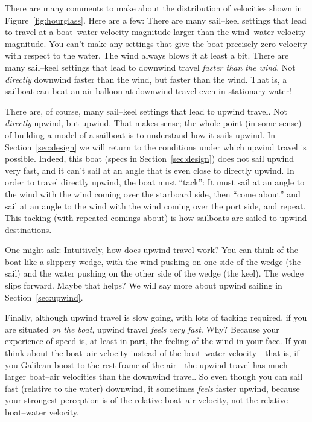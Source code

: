\documentclass[letterpaper]{article}
\newcommand{\secref}[1]{Section~\ref{#1}}
\newcommand{\figref}[1]{Figure~\ref{#1}}
\begin{document}
There are many comments to make about the distribution of velocities shown in \figref{fig:hourglass}.
Here are a few:
There are many sail--keel settings that lead to travel at a boat--water velocity magnitude larger than the wind--water velocity magnitude.
You can't make any settings that give the boat precisely zero velocity with respect to the water.
The wind always blows it at least a bit.
There are many sail--keel settings that lead to downwind travel \emph{faster than the wind}.
Not \emph{directly} downwind faster than the wind, but faster than the wind.
That is, a sailboat can beat an air balloon at downwind travel even in stationary water!

There are, of course, many sail--keel settings that lead to upwind travel.
Not \emph{directly} upwind, but upwind.
That makes sense; the whole point (in some sense) of building a model of a sailboat is to understand how it sails upwind.
In \secref{sec:design} we will return to the conditions under which upwind travel is possible.
Indeed, this boat (specs in \secref{sec:design}) does not sail upwind very fast, and it can't sail at an angle that is even close to directly upwind.
In order to travel directly upwind, the boat must ``tack'': It must sail at an angle to the wind with the wind coming over the starboard side, then ``come about'' and sail at an angle to the wind with the wind coming over the port side, and repeat.
This tacking (with repeated comings about) is how sailboats are sailed to upwind destinations.

One might ask: Intuitively, how does upwind travel work?
You can think of the boat like a slippery wedge, with the wind pushing on one side of the wedge (the sail) and the water pushing on the other side of the wedge (the keel).
The wedge slips forward.
Maybe that helps?
We will say more about upwind sailing in \secref{sec:upwind}.

Finally, although upwind travel is slow going, with lots of tacking required, if you are situated \emph{on the boat}, upwind travel \emph{feels very fast}.
Why?
Because your experience of speed is, at least in part, the feeling of the wind in your face.
If you think about the boat--air velocity instead of the boat--water velocity---that is, if you Galilean-boost to the rest frame of the air---the upwind travel has much larger boat--air velocities than the downwind travel.
So even though you can sail fast (relative to the water) downwind, it sometimes \emph{feels} faster upwind, because your strongest perception is of the relative boat--air velocity, not the relative boat--water velocity.
\end{document}
